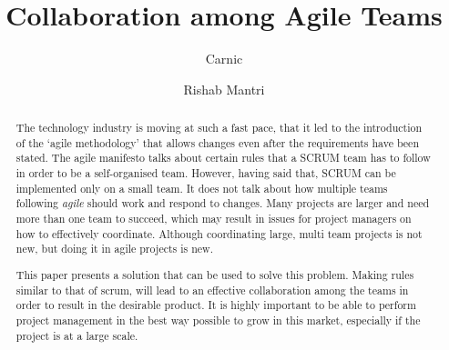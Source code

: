 \documentclass[sigconf]{acmart}
\begin{document}
%
\title{Collaboration among Agile Teams}

%
\author{Carnic}

\author{Rishab Mantri}


%
\begin{abstract}
	The technology industry is moving at such a fast pace, that it led to the introduction of the ‘agile methodology’ that allows changes even after the requirements have been stated. The agile manifesto talks about certain rules that a SCRUM team has to follow in order to be a self-organised team. However, having said that, SCRUM can be implemented only on a small team. It does not talk about how multiple teams following \textit {agile} should work and respond to changes. Many projects are larger and need more than one team to succeed, which may result in issues for project managers on how to effectively coordinate. Although coordinating large, multi team projects is not new, but doing it in agile projects is new. 
	
	
	This paper presents a solution that can be used to solve this problem. Making rules similar to that of scrum, will lead to an effective collaboration among the teams in order to result in the desirable product. It is highly important to be able to perform project management in the best way possible to grow in this market, especially if the project is at a large scale.
\end{abstract}


%

%
\end{document}
